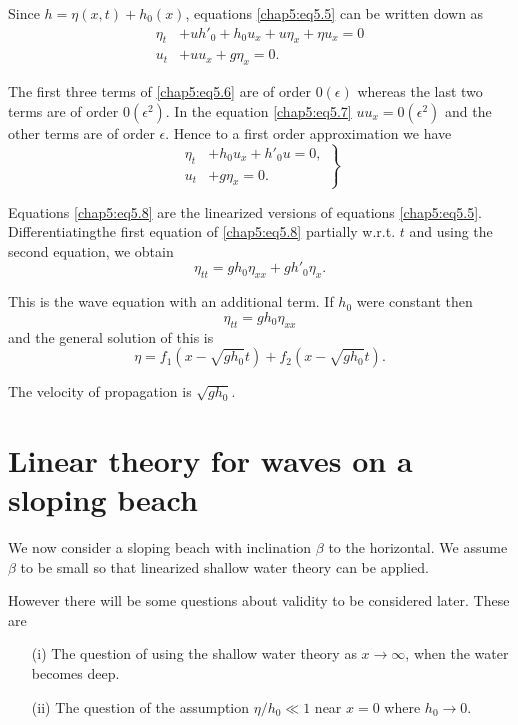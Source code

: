 Since $h=\eta(x,t)+h_0(x)$, equations \eqref{chap5:eq5.5} can be written down as 
\begin{align}
\eta_t &+ uh'_0+h_0u_x+u\eta_x+\eta u_x=0\tag{5.6}\label{chap5:eq5.6}\\
u_t &+ uu_x+g\eta_x=0.\tag{5.7}\label{chap5:eq5.7}
\end{align}

The first three terms of \eqref{chap5:eq5.6} are of order $0(\epsilon)$ whereas the last two terms are of order $0(\epsilon^2)$. In the equation \eqref{chap5:eq5.7} $uu_x=0(\epsilon^2)$ and the other terms are of order $\epsilon$. Hence to a first order approximation we have 
\begin{equation}
\left.
\begin{aligned}
\eta_t &+ h_0u_x+h'_0u=0,\\
u_t &+ g\eta_x=0.
\end{aligned}
\right\}\tag{5.8}\label{chap5:eq5.8}
\end{equation}

Equations \eqref{chap5:eq5.8} are the linearized versions of equations \eqref{chap5:eq5.5}. Differentiating\pageoriginale the first equation of \eqref{chap5:eq5.8} partially w.r.t. $t$ and using the second equation, we obtain
\begin{equation}
\eta_{tt}=gh_0\eta_{xx}+gh'_0\eta_x.\tag{5.9}\label{chap5:eq5.9}
\end{equation}

This is the wave equation with an additional term. If $h_0$ were constant then 
$$
\eta_{tt}=gh_0\eta_{xx}
$$
and the general solution of this is 
$$
\eta=f_1\left(x-\sqrt{gh_0}t\right)+f_2\left(x-\sqrt{gh_0}t\right).
$$

The velocity of propagation is $\sqrt{gh_0}$. 

\section{Linear theory for waves on a sloping beach}\label{chap5:sec5.3}

We now consider a sloping beach with inclination $\beta$ to the horizontal. We assume $\beta$ to be small so that linearized shallow water theory can be applied.

However there will be some questions about validity to be considered later. These are 
\begin{enumerate}
\item [(i)] The question of using the shallow water theory as $x\to\infty$, when the water becomes deep. 
\item [(ii)] The question of the assumption $\eta/h_0\ll 1$ near $x=0$ where $h_0\to 0$.
\end{enumerate}

